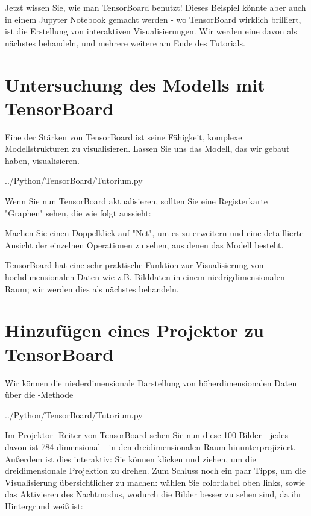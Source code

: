 
Jetzt wissen Sie, wie man TensorBoard benutzt! Dieses Beispiel könnte aber auch in einem Jupyter Notebook gemacht werden - wo TensorBoard wirklich brilliert, ist die Erstellung von interaktiven Visualisierungen. Wir werden eine davon als nächstes behandeln, und mehrere weitere am Ende des Tutorials.

\section{Untersuchung des Modells mit TensorBoard}

Eine der Stärken von TensorBoard ist seine Fähigkeit, komplexe Modellstrukturen zu visualisieren. Lassen Sie uns das Modell, das wir gebaut haben, visualisieren.


{../Python/TensorBoard/Tutorium.py}

Wenn Sie nun TensorBoard aktualisieren, sollten Sie eine Registerkarte "Graphen" sehen, die wie folgt aussieht:


Machen Sie einen Doppelklick auf "Net", um es zu erweitern und eine detaillierte Ansicht der einzelnen Operationen zu sehen, aus denen das Modell besteht.

\bigskip

TensorBoard hat eine sehr praktische Funktion zur Visualisierung von hochdimensionalen Daten wie z.B. Bilddaten in einem niedrigdimensionalen Raum; wir werden dies als nächstes behandeln.

\section{Hinzufügen eines \glqq Projektor\grqq{} zu TensorBoard}

Wir können die niederdimensionale Darstellung von höherdimensionalen Daten über die 
-Methode


{../Python/TensorBoard/Tutorium.py}

Im \glqq Projektor\grqq{} -Reiter von TensorBoard sehen Sie nun diese 100 Bilder - jedes davon ist 784-dimensional - in den dreidimensionalen Raum hinunterprojiziert. Außerdem ist dies interaktiv: Sie können klicken und ziehen, um die dreidimensionale Projektion zu drehen. Zum Schluss noch ein paar Tipps, um die Visualisierung übersichtlicher zu machen: wählen Sie \glqq color:label\grqq{} oben links, sowie das Aktivieren des \glqq Nachtmodus\grqq, wodurch die Bilder besser zu sehen sind, da ihr Hintergrund weiß ist:

